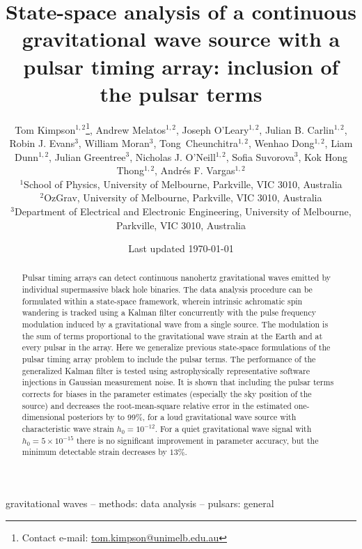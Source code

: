 \documentclass[fleqn,usenatbib,useAMS]{mnras}
\title[State-space PTA]{State-space analysis of a continuous gravitational wave source with a pulsar timing array: inclusion of the pulsar terms}
\author[Kimpson]{Tom Kimpson$^{1,2}$\thanks{Contact e-mail: \href{tom.kimpson@unimelb.edu.au}{tom.kimpson@unimelb.edu.au}}, Andrew Melatos$^{1,2}$, Joseph O'Leary$^{1,2}$, Julian B. Carlin$^{1,2}$, Robin J. Evans$^{3}$, \newauthor William Moran$^{3}$, Tong Cheunchitra$^{1,2}$, Wenhao Dong$^{1,2}$, Liam Dunn$^{1,2}$, Julian Greentree$^{3}$, Nicholas J. O'Neill$^{1,2}$, \newauthor Sofia Suvorova$^{3}$, Kok Hong Thong$^{1,2}$, Andrés F. Vargas$^{1,2}$%
\\
$^{1}$School of Physics, University of Melbourne, Parkville, VIC 3010, Australia \\
$^{2}$OzGrav, University of Melbourne, Parkville, VIC 3010, Australia \\
$^{3}$Department of Electrical and Electronic Engineering, University of Melbourne, Parkville, VIC 3010, Australia }
\date{Last updated \today}
\begin{document}
\label{firstpage}
\pagerange{\pageref{firstpage}--\pageref{lastpage}}
\maketitle

\begin{abstract}	
	 Pulsar timing arrays can detect continuous nanohertz gravitational waves emitted by individual supermassive black hole binaries. The data analysis procedure can be formulated within a state-space framework, wherein intrinsic achromatic spin wandering is tracked using a Kalman filter concurrently with the pulse frequency modulation induced by a gravitational wave from a single source. The modulation is the sum of terms proportional to the gravitational wave strain at the Earth and at every pulsar in the array. Here we generalize previous state-space formulations of the pulsar timing array problem to include the pulsar terms. The performance of the generalized Kalman filter is tested using astrophysically representative software injections in Gaussian measurement noise. It is shown that including the pulsar terms corrects for biases in the parameter estimates (especially the sky position of the source) and decreases the root-mean-square relative error in the estimated one-dimensional posteriors by to 99\%, for a loud gravitational wave source with characteristic wave strain $h_0 = 10^{-12}$. For a quiet gravitational wave signal with $h_0 = 5 \times 10^{-15}$ there is no significant improvement in parameter accuracy, but the minimum detectable strain decreases by $13\%$.
\end{abstract}

\begin{keywords}
gravitational waves -- methods: data analysis -- pulsars: general
\end{keywords}



\begingroup
\let\clearpage\relax
\endgroup
\newpage
\end{document}
